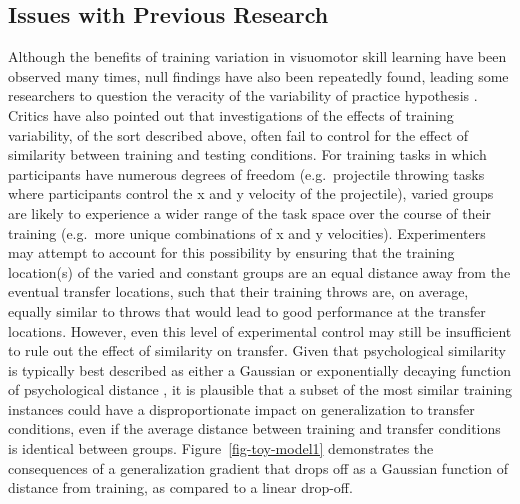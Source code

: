 \documentclass[
  12pt,
  letterpaper,
]{article}
\begin{document}
\subsection{Issues with Previous
Research}\label{issues-with-previous-research}

Although the benefits of training variation in visuomotor skill learning
have been observed many times, null findings have also been repeatedly
found, leading some researchers to question the veracity of the
variability of practice hypothesis
\autocite{newellSchemaTheory19752003,vanrossumSchmidtSchemaTheory1990}.
Critics have also pointed out that investigations of the effects of
training variability, of the sort described above, often fail to control
for the effect of similarity between training and testing conditions.
For training tasks in which participants have numerous degrees of
freedom (e.g.~projectile throwing tasks where participants control the x
and y velocity of the projectile), varied groups are likely to
experience a wider range of the task space over the course of their
training (e.g.~more unique combinations of x and y velocities).
Experimenters may attempt to account for this possibility by ensuring
that the training location(s) of the varied and constant groups are an
equal distance away from the eventual transfer locations, such that
their training throws are, on average, equally similar to throws that
would lead to good performance at the transfer locations. However, even
this level of experimental control may still be insufficient to rule out
the effect of similarity on transfer. Given that psychological
similarity is typically best described as either a Gaussian or
exponentially decaying function of psychological distance
\autocites{ennisMultidimensionalStochasticTheory1988,ghahramaniGeneralizationLocalRemappings1996,loganInstanceTheoryAutomatization1988,nosofskySimilarityScalingCognitive1992,shepardUniversalLawGeneralization1987}[
]{thoroughmanRapidReshapingHuman2005}, it is plausible that a subset of
the most similar training instances could have a disproportionate impact
on generalization to transfer conditions, even if the average distance
between training and transfer conditions is identical between groups.
Figure~\ref{fig-toy-model1} demonstrates the consequences of a
generalization gradient that drops off as a Gaussian function of
distance from training, as compared to a linear drop-off.
\end{document}
